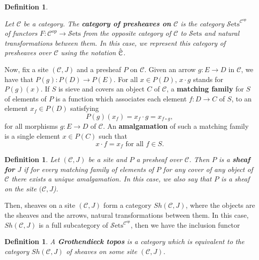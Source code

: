 \documentclass[10pt,a4paper]{amsart}
\newtheorem{Def}[Theo]{Definition}
\newcommand{\C}{\mathcal{C}}
\newcommand{\Sets}{\mathcal{S}\text{ets}}
\begin{document}
\begin{Def}\label{categoryofpresheavesdef}
	
	Let $\C$ be a category. The \textbf{category of presheaves on} $\C$ is the category ${\Sets}^{\C^{op}}$ of functors $F: \C^{op} \to \Sets$ from the opposite category of $\C$ to $\Sets$ and natural transformations between them. In this case, we represent this category of presheaves over $\C$ using the notation $\Hat{\C}$. 
	
\end{Def}

Now, fix a site $(\C,J)$ and a presheaf $P$ on $\C$. Given an arrow $g: E \to D$ in $\C$, we have that $P(g) : P(D) \to P(E)$. For all $x \in P(D)$, $x \cdot g$ stands for $P(g)(x)$.  If $S$ is sieve and covers an object $C$ of $\C$, a \textbf{matching family} for $S$ of elements of $P$ is a function which associates each element $f: D \to C$ of $S$, to an element $x_{f} \in P(D)$ satisfying $$P(g)(x_{f}) = x_{f} \cdot g = x_{f\circ g},$$ for all morphisms $g: E \to D$ of $\C$. An \textbf{amalgamation} of such a matching family is a single element $x \in P(C)$ such that $$x \cdot f = x_{f} \text{ for all } f \in S.$$

\begin{Def}\label{Sheafdef}
	Let $(\C,J)$ be a site and $P$ a presheaf over $\C$. Then $P$ is a \textbf{sheaf for} $J$ if for every matching family  of elements of $P$ for any cover of any object of $\C$ there exists a unique amalgamation. In this case, we also say that $P$ is a sheaf on the site $(\C,J$).
\end{Def}

Then, sheaves on a site $(\C,J)$ form a category $Sh(\C,J)$, where the objects are the sheaves and the arrows, natural transformations between them. In this case, $Sh(\C, J)$ is a full subcategory of $\Sets^{\C^{op}}$, then we have the inclusion functor

\begin{center}
\end{center}

\begin{Def}
	A \textbf{Grothendieck topos} is a category which is equivalent to the category $Sh(\C,J)$ of sheaves on some site $(\C,J)$.
\end{Def}
\end{document}
